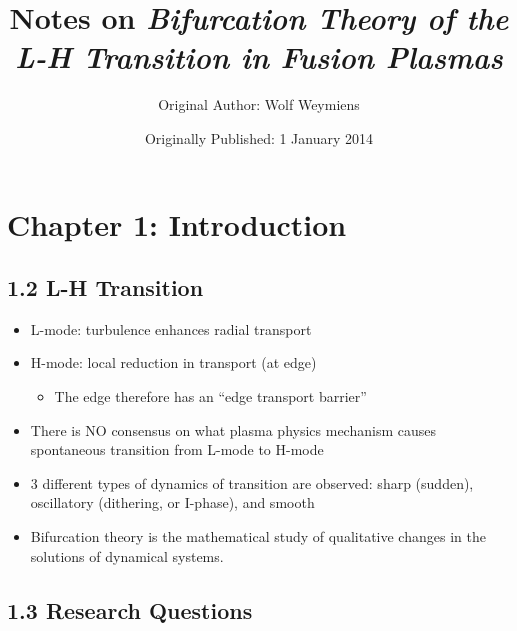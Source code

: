 \documentclass[a4paper]{article}
\title{Notes on \emph{Bifurcation Theory of the L-H Transition in Fusion Plasmas}}
\author{Original Author: Wolf Weymiens}
\date{Originally Published: 1 January 2014}
\begin{document}
\maketitle

\section{Chapter 1: Introduction}\label{chapter-1-introduction}

\subsection{1.2 L-H Transition}\label{l-h-transition}

\begin{itemize}
\item
  L-mode: turbulence enhances radial transport
\item
  H-mode: local reduction in transport (at edge)

  \begin{itemize}
  \itemsep1pt\parskip0pt
  \item
    The edge therefore has an ``edge transport barrier''
  \end{itemize}
\item
  There is NO consensus on what plasma physics mechanism causes
  spontaneous transition from L-mode to H-mode
\item
  3 different types of dynamics of transition are observed: sharp
  (sudden), oscillatory (dithering, or I-phase), and smooth
\item
  Bifurcation theory is the mathematical study of qualitative changes in
  the solutions of dynamical systems.
\end{itemize}

\subsection{1.3 Research Questions}\label{research-questions}
\end{document}
